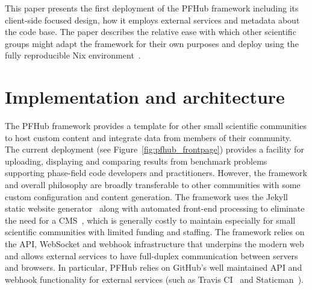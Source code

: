 \documentclass{jors}
\begin{document}
This paper presents the first deployment of the PFHub framework
including its client-side focused design, how it employs external
services and metadata about the code base. The paper describes the
relative ease with which other scientific groups might adapt the
framework for their own purposes and deploy using the fully
reproducible Nix environment~\cite{nix}.

\section*{Implementation and architecture}

The PFHub framework provides a template for other small scientific
communities to host custom content and integrate data from members of
their community. The current deployment (see
Figure~\ref{fig:pfhub_frontpage}) provides a facility for uploading,
displaying and comparing results from benchmark problems supporting
phase-field code developers and practitioners. However, the framework
and overall philosophy are broadly transferable to other communities
with some custom configuration and content generation. The framework
uses the Jekyll static website generator~\cite{jekyll} along with
automated front-end processing to eliminate the need for a
CMS~\cite{cmsfree}, which is generally costly to maintain especially
for small scientific communities with limited funding and staffing.
The framework relies on the API, WebSocket and webhook infrastructure
that underpins the modern web and allows external services to have
full-duplex communication between servers and browsers. In particular,
PFHub relies on GitHub's well maintained API and webhook functionality
for external services (such as Travis CI~\cite{travis} and
Staticman~\cite{staticman}).
\end{document}
